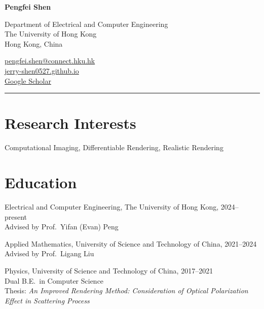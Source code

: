\documentclass[11pt,a4paper]{article}
\newcommand{\myname}{Pengfei Shen}
\newcommand{\namefont}[1]{{\normalfont\bfseries\Huge{#1}}}
\newcommand{\listitemspace}{0.15em}
\renewenvironment{itemize}
{\begin{list}{}{\setlength{\leftmargin}{0em}
                \setlength{\parskip}{0em}
                \setlength{\itemsep}{\listitemspace}
                \setlength{\parsep}{\listitemspace}}}
{\end{list}}
\newcommand{\hr}{\vspace{0.3em}\noindent\hrule\vspace{0.5em}}
\begin{document}
\raggedright{}

\namefont{\myname}

\vspace{0.6em}
\begin{minipage}[t]{0.48\textwidth}
    Department of Electrical and Computer Engineering\\
    The University of Hong Kong\\
    Hong Kong, China
\end{minipage}
\hfill
\begin{minipage}[t]{0.48\textwidth}
    \raggedleft{}
    \href{mailto:pengfei.shen@connect.hku.hk}{pengfei.shen@connect.hku.hk}\\
    \href{https://jerry-shen0527.github.io}{jerry-shen0527.github.io}\\
    \href{https://scholar.google.com/citations?user=02yniQsAAAAJ}{Google Scholar}
\end{minipage}

\hr

\section*{Research Interests}

\begin{itemize}
    \item Computational Imaging, Differentiable Rendering, Realistic Rendering
\end{itemize}

\section*{Education}

\begin{tablist}
    \item[Ph.D.] \tab{}Electrical and Computer Engineering, The University of Hong Kong, 2024--present \\
                  \hspace{1em}Advised by Prof.\ Yifan (Evan) Peng
    \item[M.S.]  \tab{}Applied Mathematics, University of Science and Technology of China, 2021--2024 \\
                  \hspace{1em}Advised by Prof.\ Ligang Liu
    \item[B.S.]  \tab{}Physics, University of Science and Technology of China, 2017--2021 \\
                  \hspace{1em}Dual B.E.\ in Computer Science \\
                  \hspace{1em}Thesis: \textit{An Improved Rendering Method: Consideration of Optical Polarization Effect in Scattering Process}
\end{tablist}
\end{document}
